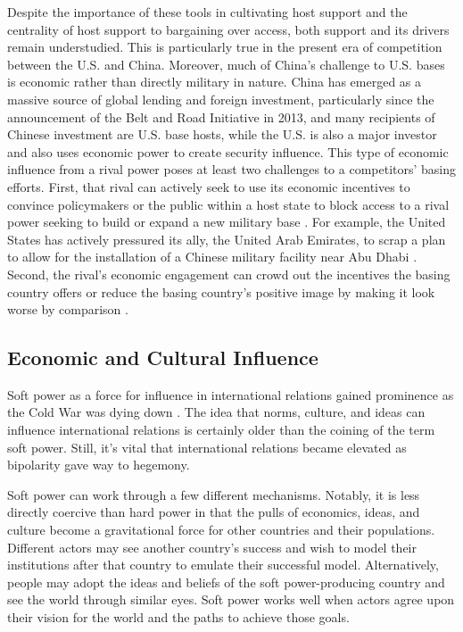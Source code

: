 Despite the importance of these tools in cultivating host support and the centrality of host support to bargaining over access, both support and its drivers remain understudied. This is particularly true in the present era of competition between the U.S. and China. Moreover, much of China's challenge to U.S. bases is economic rather than directly military in nature. China has emerged as a massive source of global lending and foreign investment, particularly since the announcement of the Belt and Road Initiative in 2013, and many recipients of Chinese investment are U.S. base hosts, while the U.S. is also a major investor and also uses economic power to create security influence. This type of economic influence from a rival power poses at least two challenges to a competitors' basing efforts. First, that rival can actively seek to use its economic incentives to convince policymakers or the public within a host state to block access to a rival power seeking to build or expand a new military base \cite{joyce2023}. For example, the United States has actively pressured its ally, the United Arab Emirates, to scrap a plan to allow for the installation of a Chinese military facility near Abu Dhabi \cite{hudson2023}. Second, the rival's economic engagement can crowd out the incentives the basing country offers or reduce the basing country's positive image by making it look worse by comparison \cite{joyce2023}.

\subsection*{Economic and Cultural Influence}

Soft power as a force for influence in international relations gained prominence as the Cold War was dying down \cite{nye1990}. The idea that norms, culture, and ideas can influence international relations is certainly older than the coining of the term soft power. Still, it's vital that international relations became elevated as bipolarity gave way to hegemony. 

Soft power can work through a few different mechanisms. Notably, it is less directly coercive than hard power in that the pulls of economics, ideas, and culture become a gravitational force for other countries and their populations. Different actors may see another country's success and wish to model their institutions after that country to emulate their successful model. Alternatively, people may adopt the ideas and beliefs of the soft power-producing country and see the world through similar eyes. Soft power works well when actors agree upon their vision for the world and the paths to achieve those goals.


